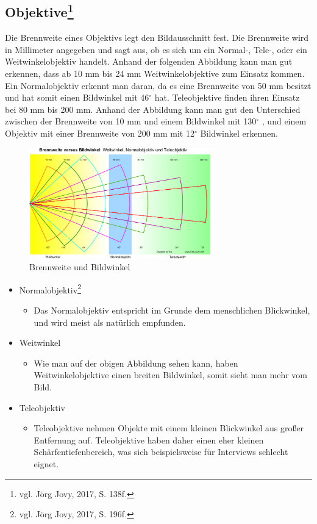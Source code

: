 \subsection[Objektive]{Objektive\protect\footnote{\label{}vgl. Jörg Jovy, 2017, S. 138f.}}
Die Brennweite eines Objektivs legt den Bildausschnitt fest. Die Brennweite wird in Millimeter angegeben und sagt aus, ob es sich um ein Normal-, Tele-, oder ein Weitwinkelobjektiv handelt.
Anhand der folgenden Abbildung kann man gut erkennen, dass ab 10 mm bis 24 mm Weitwinkelobjektive zum Einsatz kommen. Ein Normalobjektiv erkennt man daran, da es eine Brennweite von 50 mm besitzt und hat somit einen Bildwinkel mit 46$^\circ$ hat. Teleobjektive finden ihren Einsatz bei 80 mm bis 200 mm. Anhand der Abbildung kann man gut den Unterschied zwischen der Brennweite von 10 mm und einem Bildwinkel mit 130$^\circ$ , und einem Objektiv mit einer Brennweite von 200 mm mit 12$^\circ$ Bildwinkel erkennen. 
\begin{figure}[H]
	\centering
	\includegraphics[width=0.7\textwidth]{abb1} 
	\caption{Brennweite und Bildwinkel}
\end{figure}
\begin{itemize}
	\item Normalobjektiv\footnote{\label{}vgl. Jörg Jovy, 2017, S. 196f.}
		\begin{itemize}
		\item Das Normalobjektiv entspricht im Grunde dem menschlichen Blickwinkel, und wird meist als natürlich empfunden. 
		\end{itemize}
	\item Weitwinkel
		\begin{itemize}
		\item Wie man auf der obigen Abbildung sehen kann, haben Weitwinkelobjektive einen breiten Bildwinkel, somit sieht man mehr vom Bild. 
		\end{itemize}
	\item Teleobjektiv
		\begin{itemize}
		\item Teleobjektive nehmen Objekte mit einem kleinen Blickwinkel aus großer Entfernung auf. Teleobjektive haben daher einen eher kleinen Schärfentiefenbereich, was sich beispielsweise für Interviews schlecht eignet. 
\end{itemize}
\end{itemize}
